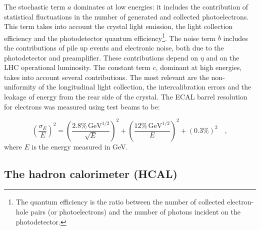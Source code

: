 The stochastic term $a$ dominates at low energies: it includes the contribution of statistical fluctuations in the number of generated and collected photoelectrons. This term takes into account the crystal light emission, the light collection efficiency and the photodetector quantum efficiency\footnote{The quantum efficiency is the ratio between the number of collected electron-hole pairs (or photoelectrons) and the number of photons incident on the photodetector.}. The noise term $b$ includes the contributions of pile up events and electronic noise, both due to the photodetector and preamplifier. These contributions depend on $\eta$ and on the LHC operational luminosity.
The constant term $c$, dominant at high energies, takes into account several contributions. The most relevant are the non-uniformity of the longitudinal light collection, the intercalibration errors and the leakage of energy from the rear side of the crystal. The ECAL barrel resolution for electrons was measured using test beams to be:

\begin{equation}
\left(\frac{\sigma_E}{E}\right)^2 = \left(\frac{2.8\%\,\mathrm{GeV^{1/2}}}{\sqrt{E}}\right)^2 + \left(\frac{12\%\,\mathrm{GeV^{1/2}}}{E}\right)^2 + (0.3\%)^2 \quad,
\end{equation}
where $E$ is the energy measured in GeV.

\subsection{The hadron calorimeter (HCAL)}

